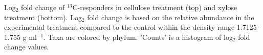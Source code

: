 Log$_{2}$ fold change of $^{13}$C-responders in cellulose
treatment (top) and xylose treatment (bottom).  Log$_{2}$ fold change is based
on the relative abundance in the experimental treatment compared to the control
within the density range 1.7125-1.755 g ml$^{-1}$. Taxa are
colored by phylum. 'Counts' is a histogram of log$_{2}$ fold change values.    

